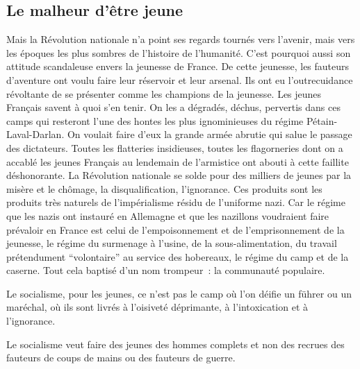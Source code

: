 \documentclass[french,twoside]{book} %
\begin{document}
\subsection[Le malheur d’être jeune]{Le malheur d’être jeune}
\noindent Mais la Révolution nationale n’a point ses regards tournés vers l’avenir, mais vers les époques les plus sombres de l’histoire de l’humanité. C’est pourquoi aussi son attitude scandaleuse envers la jeunesse de France. De cette jeunesse, les fauteurs d’aventure ont voulu faire leur réservoir et leur arsenal. Ils ont eu l’outrecuidance révoltante de se présenter comme les champions de la jeunesse. Les jeunes Français savent à quoi s’en tenir. On les a dégradés, déchus, pervertis dans ces camps qui resteront l’une des hontes les plus ignominieuses du régime Pétain-Laval-Darlan. On voulait faire d’eux la grande armée abrutie qui salue le passage des dictateurs. Toutes les flatteries insidieuses, toutes les flagorneries dont on a accablé les jeunes Français au lendemain de l’armistice ont abouti à cette faillite déshonorante. La Révolution nationale se solde pour des milliers de jeunes par la misère et le chômage, la disqualification, l’ignorance. Ces produits sont les produits très naturels de l’impérialisme résidu de l’uniforme nazi. Car le régime que les nazis ont instauré en Allemagne et que les nazillons voudraient faire prévaloir en France est celui de l’empoisonnement et de l’emprisonnement de la jeunesse, le régime du surmenage à l’usine, de la sous-alimentation, du travail prétendument “volontaire” au service des hobereaux, le régime du camp   et de la caserne. Tout cela baptisé d’un nom trompeur : la communauté populaire.\par
Le socialisme, pour les jeunes, ce n’est pas le camp où l’on déifie un führer ou un maréchal, où ils sont livrés à l’oisiveté déprimante, à l’intoxication et à l’ignorance.\par
Le socialisme veut faire des jeunes des hommes complets et non des recrues des fauteurs de coups de mains ou des fauteurs de guerre.
\end{document}
